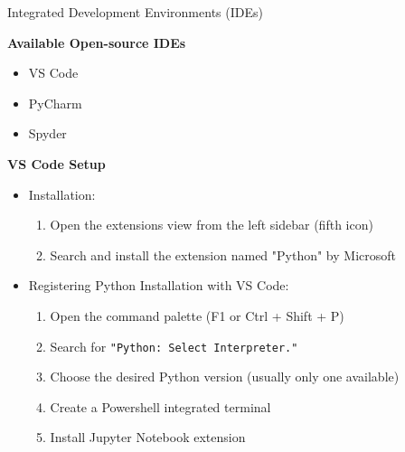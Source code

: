 \documentclass[
	11pt, 
]{beamer}
\begin{document}
\begin{frame}{Integrated Development Environments (IDEs)}
\begin{exampleblock}{\textbf{Available Open-source IDEs}}
\begin{itemize}
    \item VS Code 

    \item PyCharm

    \item Spyder
\end{itemize}
\end{exampleblock}

\textbf{VS Code Setup}

\begin{itemize}
    \item Installation:
    \begin{enumerate}
        \item  Open the extensions view from the left sidebar (fifth icon)
        \item Search and install the extension named "Python" by Microsoft
    \end{enumerate} \smallskip
    
    \item Registering Python Installation with VS Code:
    \begin{enumerate}
        \item Open the command palette (F1 or Ctrl + Shift + P)
        \item Search for \texttt{"Python: Select Interpreter."}
        \item Choose the desired Python version (usually only one available)
        \item Create a Powershell integrated terminal
        \item Install Jupyter Notebook extension
     \end{enumerate}

     
\end{itemize}

\end{frame}

\end{document}
